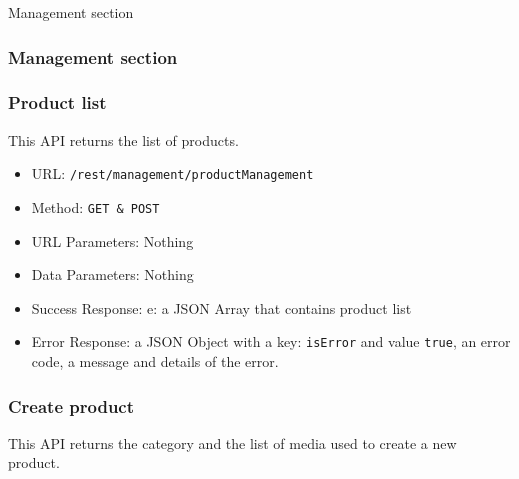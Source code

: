 Management section

\subsubsection{Management section}
\subsubsection*{Product list}
This API returns the list of products.

\begin{itemize}
    \item URL: \texttt{/rest/management/productManagement}
    \item Method: \texttt{{GET \& POST}}
    \item URL Parameters: Nothing
    \item Data Parameters: Nothing
    \item Success Response: e: a JSON Array that contains product list 
    \item Error Response: a JSON Object with a key: \texttt{isError}  and value \texttt{true}, an error code, a message and details of the error.
\end{itemize}

\subsubsection*{Create product}
This API returns the category and the list of media used to create a new product.


